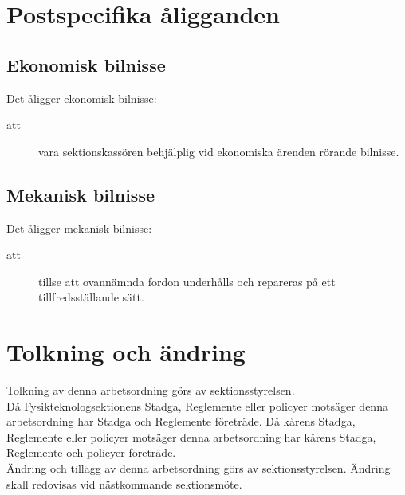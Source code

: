 \section{Postspecifika åligganden}
\subsection{Ekonomisk bilnisse}
Det åligger ekonomisk bilnisse:

    \begin{description}
      \item[att] vara sektionskassören behjälplig vid ekonomiska
      ärenden rör\-an\-de bilnisse.
    \end{description}

\subsection{Mekanisk bilnisse}
Det åligger mekanisk bilnisse:
    \begin{description}
      \item[att] tillse att ovannämnda fordon underhålls och repareras
      på ett tillfredsställande sätt.
    \end{description}

\section{Tolkning och ändring}
Tolkning av denna arbetsordning görs av sektionsstyrelsen.\\ Då Fysikteknologsektionens Stadga, Reglemente eller policyer motsäger denna arbetsordning har Stadga och Reglemente företräde. Då kårens Stadga, Reglemente eller policyer motsäger denna arbetsordning har kårens Stadga, Reglemente och policyer företräde.\\
Ändring och tillägg av denna arbetsordning görs av sektionsstyrelsen. Ändring skall redovisas vid nästkommande sektionsmöte. 

\newpage




